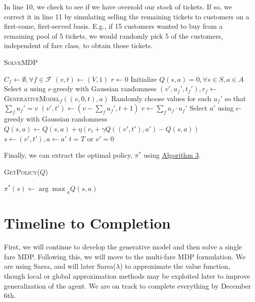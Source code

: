 \documentclass[10pt,letterpaper]{article}
\begin{document}
\begin{multicols*}{2}
In line 10, we check to see if we have oversold our stock of tickets. If so, we correct it in line 11 by simulating selling the remaining tickets to customers on a first-come, first-served basis. E.g., if 15 customers wanted to buy from a remaining pool of 5 tickets, we would randomly pick 5 of the customers, independent of fare class, to obtain those tickets.

\begin{algorithm}[H]
\label{alg:solve-mdp}
	\caption{\textsc{SolveMDP}}
	\small\begin{algorithmic}[1]
	    \State $C_f \leftarrow \emptyset, \forall f \in \mathcal{F}$
        \State ${(v,t)} \leftarrow (V,1)$
    	\State ${r} \leftarrow 0$
    	\State Initialize $Q(s,a) = 0, \forall s \in S, a \in A$
    	\State Select $a$ using $\epsilon$-greedy with Gaussian randomness
    	\Repeat {}
                \State $(v',u_f',t_f'),r_f \leftarrow$ 
                \textsc{GenerativeModel$_f ((v, 0, t), a)$}
            \EndFor
     	        \State Randomly choose values for each $u_f'$ so that $\sum_f u_f' = v$
             \EndIf
             \State $(v', t') \leftarrow (v - \sum_f u_f', t + 1)$
    		\State $r \leftarrow \sum_f a_f \cdot u_f'$
    		\State Select $a'$ using $\epsilon$-greedy with Gaussian randomness
    		\State $Q(s,a) \leftarrow Q(s,a) + \eta(r_t + \gamma Q((v',t'),a') - Q(s,a))$
    		\State $s \leftarrow (v',t'), a \leftarrow a'$
     	\Until $t = T$ or $v' = 0$
	\end{algorithmic}
\end{algorithm}

Finally, we can extract the optimal policy, $\pi^*$ using \hyperref[alg:get-policy]{Algorithm 3}.

\begin{algorithm}[H]
\label{alg:get-policy}
	\caption{\textsc{GetPolicy($Q$)}}
    	\small\begin{algorithmic}[1]
     	    \State $\pi^*(s) \leftarrow {\arg\max}_a Q(s,a)$
     	\EndFor
        \State\Return {$\pi^*$}
	\end{algorithmic}
\end{algorithm}

\section*{Timeline to Completion}

First, we will continue to develop the generative model and then solve a single fare MDP. Following this, we will move to the multi-fare MDP formulation. We are using Sarsa, and will later Sarsa($\lambda$) to approximate the value function, though local or global approximation methods may be exploited later to improve generalization of the agent. We are on track to complete everything by December 6th.


\end{multicols*}
\end{document}
